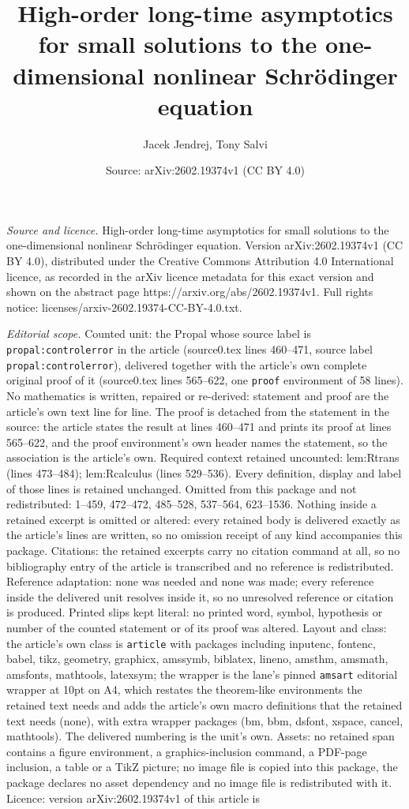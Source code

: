 \documentclass[10pt,a4paper]{amsart}
\title[High-order long-time asymptotics for small solutions to the ]{High-order long-time asymptotics for small solutions to the one-dimensional nonlinear Schr\"odinger equation}
\author{Jacek Jendrej, Tony Salvi}
\date{Source: arXiv:2602.19374v1 (CC BY 4.0)}
\begin{document}
\maketitle

\noindent\emph{Source and licence.} High-order long-time asymptotics for small solutions to the one-dimensional nonlinear Schr\"odinger equation. Version arXiv:2602.19374v1 (CC BY 4.0), distributed under the Creative Commons Attribution 4.0 International licence, as recorded in the arXiv licence metadata for this exact version and shown on the abstract page https://arxiv.org/abs/2602.19374v1. Full rights notice: licenses/arxiv-2602.19374-CC-BY-4.0.txt.\par\smallskip

\noindent\textit{Editorial scope.} Counted unit: the Propal whose source label is \texttt{propal:controlerror} in the article (source0.tex lines 460--471, source label \texttt{propal:controlerror}), delivered together with the article's own complete original proof of it (source0.tex lines 565--622, one \texttt{proof} environment of 58 lines). No mathematics is written, repaired or re-derived: statement and proof are the article's own text line for line. The proof is detached from the statement in the source: the article states the result at lines 460--471 and prints its proof at lines 565--622, and the proof environment's own header names the statement, so the association is the article's own. Required context retained uncounted: lem:Rtrans (lines 473--484); lem:Rcalculus (lines 529--536). Every definition, display and label of those lines is retained unchanged. Omitted from this package and not redistributed: 1--459, 472--472, 485--528, 537--564, 623--1536. Nothing inside a retained excerpt is omitted or altered: every retained body is delivered exactly as the article's lines are written, so no omission receipt of any kind accompanies this package. Citations: the retained excerpts carry no citation command at all, so no bibliography entry of the article is transcribed and no reference is redistributed. Reference adaptation: none was needed and none was made; every reference inside the delivered unit resolves inside it, so no unresolved reference or citation is produced. Printed slips kept literal: no printed word, symbol, hypothesis or number of the counted statement or of its proof was altered. Layout and class: the article's own class is \texttt{article} with packages including inputenc, fontenc, babel, tikz, geometry, graphicx, amssymb, biblatex, lineno, amsthm, amsmath, amsfonts, mathtools, latexsym; the wrapper is the lane's pinned \texttt{amsart} editorial wrapper at 10pt on A4, which restates the theorem-like environments the retained text needs and adds the article's own macro definitions that the retained text needs (none), with extra wrapper packages (bm, bbm, dsfont, xspace, cancel, mathtools). The delivered numbering is the unit's own. Assets: no retained span contains a figure environment, a graphics-inclusion command, a PDF-page inclusion, a table or a TikZ picture; no image file is copied into this package, the package declares no asset dependency and no image file is redistributed with it. Licence: version arXiv:2602.19374v1 of this article is 
\end{document}
